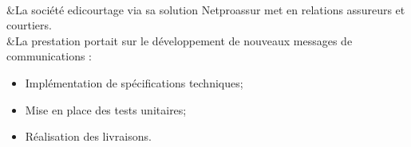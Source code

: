\\
&La société edicourtage via sa solution Netproassur met en relations assureurs et courtiers.\\
&La prestation portait sur le développement de nouveaux messages de communications :
\begin{itemize}%
	\item Implémentation de spécifications techniques;%
	\item Mise en place des tests unitaires;%
	\item Réalisation des livraisons.%
\end{itemize}%


